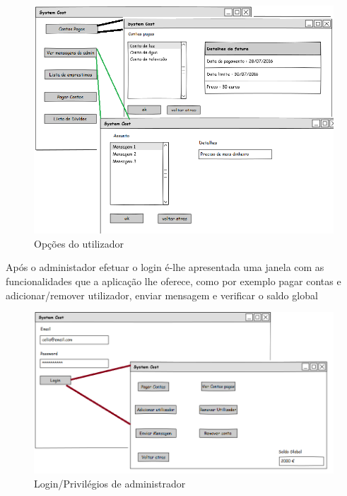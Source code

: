 \begin{figure}[h!]
	\centering
	\includegraphics[scale=0.5]{imagens/mockups/tarefasutilizador}  
	\caption{Opções do utilizador }  
\end{figure}

\newpage
Após o administador efetuar o login é-lhe apresentada uma janela com as funcionalidades que a aplicação lhe oferece, como por exemplo pagar contas e adicionar/remover utilizador, enviar mensagem e verificar o saldo global

\begin{figure}[h!]
	\centering
	\includegraphics[scale=0.5]{imagens/mockups/loginadmin}  
	\caption{Login/Privilégios de administrador }  
\end{figure}


